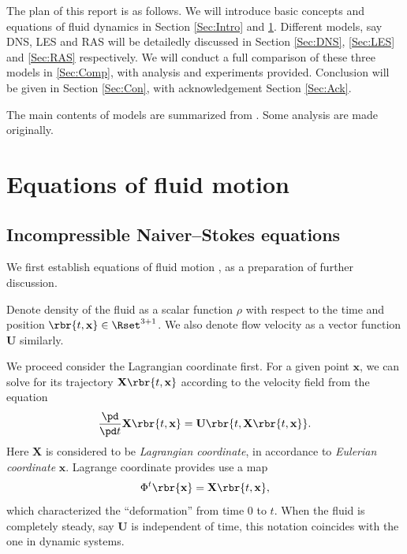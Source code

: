 \documentclass[english, nochinese]{pkupaper}
\begin{document}
The plan of this report is as follows. We will introduce basic concepts and equations of fluid dynamics in Section \ref{Sec:Intro} and \ref{Sec:Eq}. Different models, say DNS, LES and RAS will be detailedly discussed in Section \ref{Sec:DNS}, \ref{Sec:LES} and \ref{Sec:RAS} respectively. We will conduct a full comparison of these three models in \ref{Sec:Comp}, with analysis and experiments provided. Conclusion will be given in Section \ref{Sec:Con}, with acknowledgement Section \ref{Sec:Ack}.

The main contents of models are summarized from \parencite{pope_turbulent_2001} \parencite{zhaoshun_zhang_theory_2005}. Some analysis are made originally.

\section{Equations of fluid motion} \label{Sec:Eq}

\subsection{Incompressible Naiver--Stokes equations}

We first establish equations of fluid motion \parencite{pope_turbulent_2001} \parencite{ferziger_computational_2002}, as a preparation of further discussion.

Denote density of the fluid as a scalar function $\rho$ with respect to the time and position $ \rbr{ t, \mathbf{x} } \in \Rset^{ 3 + 1 } $. We also denote flow velocity as a vector function $\mathbf{U}$ similarly.

We proceed consider the Lagrangian coordinate first. For a given point $\mathbf{x}$, we can solve for its trajectory $ \mathbf{X} \rbr{ t, \mathbf{x} } $ according to the velocity field from the equation
\begin{equation}
\frac{\pd}{ \pd t } \mathbf{X} \rbr{ t, \mathbf{x} } = \mathbf{U} \rbr{ t, \mathbf{X} \rbr{ t, \mathbf{x} } }.
\end{equation}
Here $\mathbf{X}$ is considered to be \emph{Lagrangian coordinate}, in accordance to \emph{Eulerian coordinate} $\mathbf{x}$. Lagrange coordinate provides use a map
\begin{equation}
\Phi^t \rbr{\mathbf{x}} = \mathbf{X} \rbr{ t, \mathbf{x} },
\end{equation}
which characterized the ``deformation'' from time $0$ to $t$. When the fluid is completely steady, say $\mathbf{U}$ is independent of time, this notation coincides with the one in dynamic systems.
\end{document}
